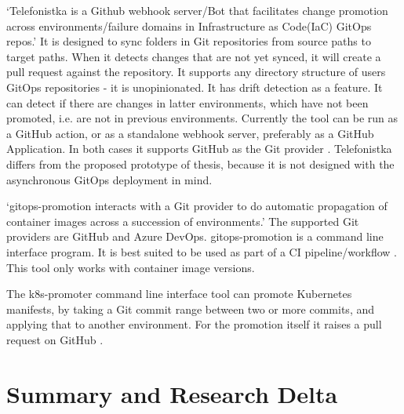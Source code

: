 \enquote*{Telefonistka is a Github webhook server/Bot that facilitates change promotion across environments/failure domains in Infrastructure as Code(IaC) GitOps repos.}
\autocite{telefonistka}
It is designed to sync folders in Git repositories from source paths to target paths.
When it detects changes that are not yet synced,
it will create a pull request against the repository.
It supports any directory structure of users GitOps repositories -
it is unopinionated.
It has drift detection as a feature. It can detect if there are changes in
latter environments, which have not been promoted, i.e. are not in previous environments.
Currently the tool can be run as a GitHub action, or as a
standalone webhook server, preferably as a GitHub Application.
In both cases it supports GitHub as the Git provider
\autocite{telefonistka}.
Telefonistka differs from the proposed prototype of thesis,
because it is not designed with the asynchronous GitOps deployment in mind.


\enquote*{gitops-promotion interacts with a Git provider to do automatic propagation of container images across a succession of environments.}
\autocite{xenitABgitopsPromotion}
The supported Git providers are GitHub and Azure DevOps.
gitops-promotion is a command line interface program.
It is best suited to be used as part of a CI pipeline/workflow
\autocite{xenitABgitopsPromotion}.
This tool only works with container image versions.


The k8s-promoter command line interface tool can promote Kubernetes manifests, by
taking a Git commit range between two or more commits, and applying that to another environment.
For the promotion itself it raises a pull request on GitHub
\autocite{form3techK8sPromoter}.

\section*{Summary and Research Delta}

